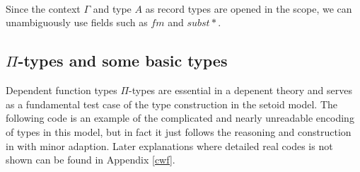 \begin{code}
\\
\>[0]\<[17]%
\>[17]   \AgdaInductiveConstructor{,} \<[29]%
\>[29]\<%
\\
\>[0]\<[17]%
\>[17]\AgdaFunction{[}  \AgdaSymbol{\_} \AgdaFunction{]trans} \AgdaSymbol{(}\AgdaFunction{[}  \AgdaSymbol{\_} \AgdaFunction{]trans} \AgdaSymbol{(}\AgdaFunction{[}  \AgdaSymbol{\_} \AgdaFunction{]sym} \AgdaSymbol{(} \AgdaSymbol{\_))}\<%
\\
\>[0]\<[17]%
\>[17]\AgdaSymbol{(} \AgdaSymbol{\_} \AgdaSymbol{))}  \AgdaSymbol{\}}\<%
\\
\>[0]\<[7]%
\>[7]\AgdaSymbol{\}}\<%
\\
\>[0]\<[7]%
\>[7] \<[13]%
\>[13]\<%
\\
\>[7]\<[9]%
\>[9]  \<%
\\
\>[7]\<[9]%
\>[9]   \<[23]%
\>[23]\<%
\\
\end{code}

Since the context $\Gamma$ and type $A$ as record types are opened in the scope, we can unambiguously use fields such as $fm$ and $subst*$.

\subsection{$\Pi$-types and some basic types}

Dependent function types $\Pi$-types are essential in a depenent theory and serves as a fundamental test case of the type construction in the setoid model. 
The following code is an example of the complicated and nearly unreadable encoding of types in this model, but in fact it just follows the reasoning and construction in \cite{alti:lics99} with minor adaption. Later explanations where detailed real codes is not shown can be found in Appendix \ref{cwf}.

